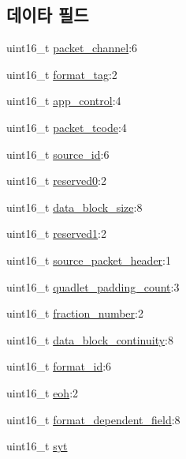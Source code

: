 \subsection*{데이타 필드}
\begin{DoxyCompactItemize}
\item 
uint16\+\_\+t \hyperlink{structsix1883__header_a3ddfab5f02c3bd28ffb22c1d4478ba67}{packet\+\_\+channel}\+:6
\item 
uint16\+\_\+t \hyperlink{structsix1883__header_a137c7a0b8f5c096e24e535416b2c12c2}{format\+\_\+tag}\+:2
\item 
uint16\+\_\+t \hyperlink{structsix1883__header_a3b52b2d4d5eb3909d1141c865563f246}{app\+\_\+control}\+:4
\item 
uint16\+\_\+t \hyperlink{structsix1883__header_ac86ef7cc33218945d4c73609a2fc58fb}{packet\+\_\+tcode}\+:4
\item 
uint16\+\_\+t \hyperlink{structsix1883__header_a66347b57ca499b03efde0826d99533fc}{source\+\_\+id}\+:6
\item 
uint16\+\_\+t \hyperlink{structsix1883__header_af183276fcf5731396c007fa180c6c6b3}{reserved0}\+:2
\item 
uint16\+\_\+t \hyperlink{structsix1883__header_a70463341a111fa9a10acb9c082870fce}{data\+\_\+block\+\_\+size}\+:8
\item 
uint16\+\_\+t \hyperlink{structsix1883__header_a6b89b86dfe0266be2fc46cf46f6e7b72}{reserved1}\+:2
\item 
uint16\+\_\+t \hyperlink{structsix1883__header_a249b482e00959f3c2d3596b684142a90}{source\+\_\+packet\+\_\+header}\+:1
\item 
uint16\+\_\+t \hyperlink{structsix1883__header_ab44f15fc10f7e3c635c930fe3d0551c6}{quadlet\+\_\+padding\+\_\+count}\+:3
\item 
uint16\+\_\+t \hyperlink{structsix1883__header_a1a119b57c43180e27c35bc0394930879}{fraction\+\_\+number}\+:2
\item 
uint16\+\_\+t \hyperlink{structsix1883__header_a9a2bbc5c82d57a50a0b396a8f74b93d1}{data\+\_\+block\+\_\+continuity}\+:8
\item 
uint16\+\_\+t \hyperlink{structsix1883__header_adbbe8dd364d054c89e7ffc75986b2d05}{format\+\_\+id}\+:6
\item 
uint16\+\_\+t \hyperlink{structsix1883__header_a0cb731a92907e54bc99bdad81dd3552a}{eoh}\+:2
\item 
uint16\+\_\+t \hyperlink{structsix1883__header_acd85be38e562935aed45a19b170ae501}{format\+\_\+dependent\+\_\+field}\+:8
\item 
uint16\+\_\+t \hyperlink{structsix1883__header_aec1f53b0b9c6795a8e0f8f4e029fa676}{syt}
\end{DoxyCompactItemize}


